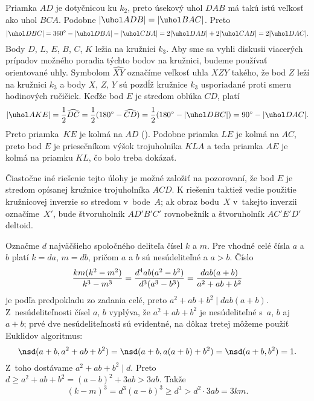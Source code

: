 {%
Priamka $AD$ je dotyčnicou ku $k_2$, preto úsekový uhol $DAB$ má takú istú veľkosť ako uhol $BCA$.
Podobne $|\uhol ADB|=|\uhol BAC|$. Preto
$$
|\uhol DBC| = 360^\circ - |\uhol DBA| - |\uhol CBA| = 2|\uhol DAB|+2|\uhol CAB| = 2 |\uhol DAC|.
$$
%
Body $D$, $L$, $E$, $B$, $C$, $K$ ležia na kružnici $k_3$.
Aby sme sa vyhli diskusii viacerých prípadov možného poradia týchto bodov na kružnici, budeme používať orientované uhly.
Symbolom $\widehat{XY}$ označíme veľkosť uhla $XZY$ takého, že bod $Z$ leží na kružnici $k_3$ a body $X$, $Z$, $Y$ sú pozdĺž kružnice $k_3$ usporiadané proti smeru hodinových ručičiek.
Keďže bod $E$ je stredom oblúka $CD$, platí
$$
|\uhol AKE| = \frac12 \widehat{DC} = \frac 12(180^\circ - \widehat{CD}) = \frac12 (180^\circ -|\uhol DBC|)=90^\circ - |\uhol DAC|.
$$
Preto priamka~$KE$ je kolmá na $AD$ (\obr). Podobne priamka $LE$ je kolmá na $AC$, preto bod $E$ je priesečníkom výšok trojuholníka $KLA$
a teda priamka $AE$ je kolmá na priamku $KL$, čo bolo treba dokázať.

\poznamka
Čiastočne iné riešenie tejto úlohy je možné založiť na pozorovaní, že bod $E$ je stredom opísanej kružnice trojuholníka $ACD$.
K riešeniu taktiež vedie použitie kružnicovej
inverzie so stredom v~bode~$A$; ak obraz bodu~$X$ v~takejto inverzii označíme~$X'$, bude štvoruholník $AD'B'C'$ rovnobežník a štvoruholník $AC'E'D'$ deltoid.
}

{%
Označme $d$ najväčšieho spoločného deliteľa čísel $k$ a $m$.
Pre vhodné celé čísla $a$ a $b$ platí $k = da$, $m = db$, pričom $a$ a $b$ sú nesúdeliteľné a $a > b$.
Číslo
$$
{km(k^2-m^2)\over k^3-m^3} = {d^4ab(a^2-b^2)\over d^3(a^3-b^3)}={dab(a+b)\over a^2+ab+b^2}
$$
je podľa predpokladu zo zadania celé, preto $a^2+ab+b^2\mid dab(a+b)$.
Z~nesúdeliteľnosti čísel $a$, $b$ vyplýva, že $a^2+ab+b^2$ je nesúdeliteľné s~$a$, $b$ aj $a+b$; prvé dve nesúdeliteľnosti sú evidentné, na dôkaz tretej môžeme použiť Euklidov algoritmus:
$$
\nsd(a+b, a^2+ab+b^2) = \nsd(a+b, a(a+b)+b^2) = \nsd(a+b, b^2) = 1.
$$
Z~toho dostávame $a^2+ab+b^2\mid d$. Preto $d\ge a^2+ab+b^2=(a-b)^2+3ab > 3ab$. Takže
$$
(k-m)^3 = d^3(a-b)^3\ge d^3> d^2\cdot 3ab = 3km.
$$
}

